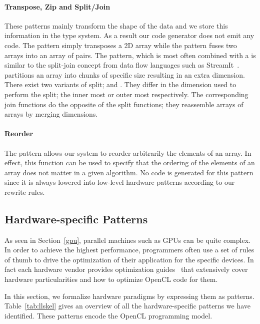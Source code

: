\paragraph{Transpose, Zip and Split/Join}
These patterns mainly transform the shape of the data and we store this information in the type system.
As a result our code generator does not emit any code.
The  pattern simply transposes a 2D array while the  pattern fuses two arrays into an array of pairs.
The  pattern, which is most often combined with a  is similar to the split-join concept from data flow languages such as StreamIt~\cite{thies02streamit}.
 partitions an array into chunks of specific size resulting in an extra dimension.
There exist two variants of split;  and .
They differ in the dimension used to perform the split; the inner most or outer most respectively.
The corresponding join functions do the opposite of the split functions; they reassemble arrays of arrays by merging dimensions.

\paragraph{Reorder}

The  pattern allows our system to reorder arbitrarily the elements of an array.
In effect, this function can be used to specify that the ordering of the elements of an array does not matter in a given algorithm.
No code is generated for this pattern since it is always lowered into low-level hardware patterns according to our rewrite rules.



\subsection{Hardware-specific Patterns}

As seen in Section~\ref{gpu}, parallel machines such as GPUs can be quite complex.
In order to achieve the highest performance, programmers often use a set of rules of thumb to drive the optimization of their application for the specific devices.
In fact each hardware vendor provides optimization guides~\cite{nvidia11guide,amd12guide} that extensively cover hardware particularities and how to optimize OpenCL code for them.

In this section, we formalize hardware paradigms by expressing them as patterns.
Table~\ref{tab:llskel} gives an overview of all the hardware-specific patterns we have identified.
These patterns encode the OpenCL programming model.

